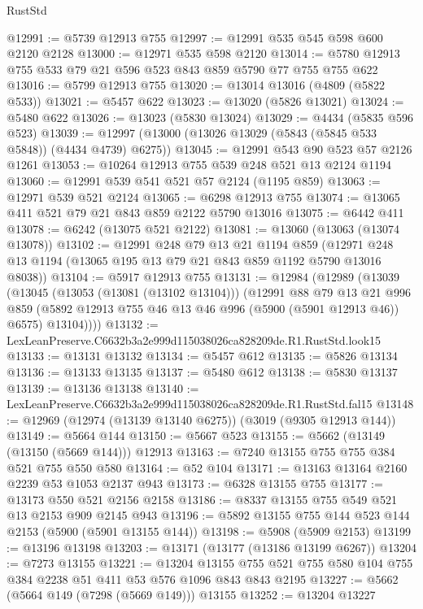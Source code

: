 \begin{lexlean}{RustStd}
\begin{coremodule}
@12991 := @5739 @12913 @755
@12997 := @12991 @535 @545 @598 @600 @2120 @2128
@13000 := @12971 @535 @598 @2120
@13014 := @5780 @12913 @755 @533 @79 @21 @596 @523 @843 @859 @5790 @77 @755 @755 @622
@13016 := @5799 @12913 @755
@13020 := @13014 @13016 (@4809 (@5822 @533))
@13021 := @5457 @622
@13023 := @13020 (@5826 @13021)
@13024 := @5480 @622
@13026 := @13023 (@5830 @13024)
@13029 := @4434 (@5835 @596 @523)
@13039 := @12997 (@13000 (@13026 @13029 (@5843 (@5845 @533 @5848)) (@4434 @4739) @6275))
@13045 := @12991 @543 @90 @523 @57 @2126 @1261
@13053 := @10264 @12913 @755 @539 @248 @521 @13 @2124 @1194
@13060 := @12991 @539 @541 @521 @57 @2124 (@1195 @859)
@13063 := @12971 @539 @521 @2124
@13065 := @6298 @12913 @755
@13074 := @13065 @411 @521 @79 @21 @843 @859 @2122 @5790 @13016
@13075 := @6442 @411
@13078 := @6242 (@13075 @521 @2122)
@13081 := @13060 (@13063 (@13074 @13078))
@13102 := @12991
    @248
    @79
    @13
    @21
    @1194
    @859
    (@12971 @248 @13 @1194 (@13065 @195 @13 @79 @21 @843 @859 @1192 @5790 @13016 @8038))
@13104 := @5917 @12913 @755
@13131 := @12984
    (@12989
      (@13039
        (@13045
          (@13053 (@13081 (@13102 @13104)))
          (@12991
            @88
            @79
            @13
            @21
            @996
            @859
            (@5892 @12913 @755 @46 @13 @46 @996 (@5900 (@5901 @12913 @46)) @6575)
            @13104))))
@13132 := LexLeanPreserve.C6632b3a2e999d115038026ca828209de.R1.RustStd.look15
@13133 := @13131 @13132
@13134 := @5457 @612
@13135 := @5826 @13134
@13136 := @13133 @13135
@13137 := @5480 @612
@13138 := @5830 @13137
@13139 := @13136 @13138
@13140 := LexLeanPreserve.C6632b3a2e999d115038026ca828209de.R1.RustStd.fal15
@13148 := @12969 (@12974 (@13139 @13140 @6275)) (@3019 (@9305 @12913 @144))
@13149 := @5664 @144
@13150 := @5667 @523
@13155 := @5662 (@13149 (@13150 (@5669 @144))) @12913
@13163 := @7240 @13155 @755 @755 @384 @521 @755 @550 @580
@13164 := @52 @104
@13171 := @13163 @13164 @2160 @2239 @53 @1053 @2137 @943
@13173 := @6328 @13155 @755
@13177 := @13173 @550 @521 @2156 @2158
@13186 := @8337 @13155 @755 @549 @521 @13 @2153 @909 @2145 @943
@13196 := @5892 @13155 @755 @144 @523 @144 @2153 (@5900 (@5901 @13155 @144))
@13198 := @5908 (@5909 @2153)
@13199 := @13196 @13198
@13203 := @13171 (@13177 (@13186 @13199 @6267))
@13204 := @7273 @13155
@13221 := @13204
    @13155
    @755
    @521
    @755
    @580
    @104
    @755
    @384
    @2238
    @51
    @411
    @53
    @576
    @1096
    @843
    @843
    @2195
@13227 := @5662 (@5664 @149 (@7298 (@5669 @149))) @13155
@13252 := @13204
    @13227

\end{coremodule}
\end{lexlean}
